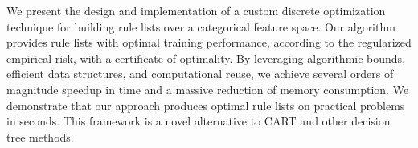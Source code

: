We present the design and implementation of a custom discrete optimization
technique for building rule lists over a categorical feature space.
%
Our algorithm provides rule lists with optimal training performance,
according to the regularized empirical risk, with a certificate of optimality.
%
By leveraging algorithmic bounds, efficient data structures,
and computational reuse, we achieve several orders of magnitude speedup in time
and a massive reduction of memory consumption.
%
We demonstrate that our approach produces optimal rule lists on practical
problems in seconds.
%
This framework is a novel alternative to CART and other decision tree methods.
